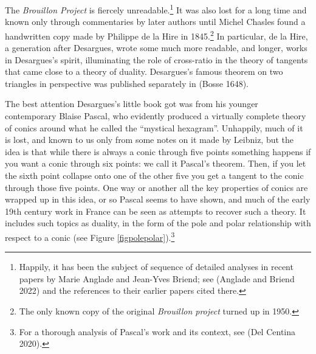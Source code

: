 \bigskip 
{}




The  \emph{Brouillon Project} is fiercely unreadable.\footnote{Happily, it has been the subject of sequence of detailed analyses in recent papers by Marie  Anglade and Jean-Yves Briend; see (Anglade and Briend 2022) and the references to their earlier papers cited there.} It was also lost for a long time and known only through commentaries by later authors until Michel Chasles found a handwritten copy made by Philippe de la Hire in 1845.\footnote{The only known copy of the original \emph{Brouillon project} turned up in 1950.} In particular, de la Hire, a generation after Desargues, wrote some much more readable, and longer, works in Desargues's spirit, illuminating the role of cross-ratio in the theory of tangents that came close to a theory of duality. Desargues's famous theorem on two triangles in perspective was published separately in (Bosse 1648).

The best attention Desargues's little book got was from his younger contemporary Blaise Pascal, who evidently produced a virtually complete theory of conics around what he called the ``mystical hexagram''. Unhappily, much of it is lost, and known to us only from some notes on it made by Leibniz, but the idea is that while there is always a conic through five points something happens if you want a conic through six points: we call it Pascal's theorem. Then, if you let the sixth point collapse onto one of the other five you get a tangent to the conic through those five points. One way or another all the key properties of conics are wrapped up in this idea, or so Pascal seems to have shown, and much of the early 19th century work in France can be seen as attempts to recover such a theory. It includes such topics as duality, in the form of the pole and polar relationship with respect to a conic (see Figure \ref{figpolepolar}).\footnote{For a thorough analysis of Pascal's work and its context, see (Del Centina 2020).} 


